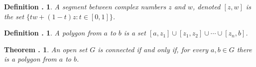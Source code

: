 \documentclass[twoside]{report}
\newcounter{Lecture}
\theoremstyle{myts}
\newcounter{c}[Lecture]
\newtheorem{dfn}[c]{Definition \arabic{Lecture}.}
\newtheorem{thm}[c]{Theorem \arabic{Lecture}.}
\newcounter{ex}[Lecture]
\begin{document}
\begin{dfn}
  A \emph{segment} between complex numbers $z$ and $w$, denoted \( [z,w] \) is the set \( \{ tw + (1-t)z : t\in [0,1] \} \).
\end{dfn}

\begin{dfn}
  A \emph{polygon} from $a$ to $b$ is a set \( [a,z_1] \cup [z_1,z_2] \cup \cdots \cup [z_n,b] \).
\end{dfn}

\begin{thm}
  An open set $G$ is connected if and only if, for every \(a,b\in G\) there is a polygon from $a$ to $b$.
\end{thm}
\end{document}
